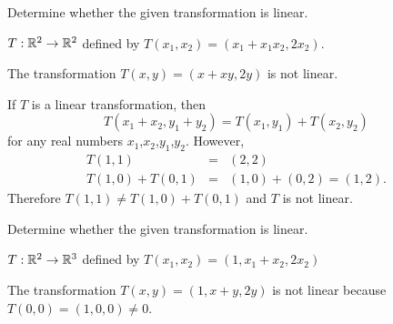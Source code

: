 \documentclass{article}
\begin{document}



\problemlabel

\noindent Determine whether the given transformation is linear.

\begin{exercise} \label{c4.3.6b}
  $T:\mathbb R^2\to\mathbb R^2$ defined by $T(x_1,x_2)=(x_1+x_1x_2,2x_2)$.

\begin{solution}
\ans The transformation $T(x,y) = (x + xy, 2y)$ is not linear.

\soln If $T$ is a linear transformation, then
\[
T(x_1 + x_2,y_1 + y_2) = T(x_1,y_1) + T(x_2,y_2)
\]
for any real numbers $x_1$,$x_2$,$y_1$,$y_2$.  However,
\[
\begin{array}{rcl}
T(1,1) & = & (2,2) \\
T(1,0) + T(0,1) & = & (1,0) + (0,2) = (1,2).\end{array}
\]
Therefore $T(1,1) \neq T(1,0) + T(0,1)$ and $T$ is not linear.

\end{solution}
\end{exercise}





\problemlabel

\noindent Determine whether the given transformation is linear.

\begin{exercise} \label{c4.3.6d}
  $T:\mathbb R^2\to\mathbb R^3$ defined by $T(x_1,x_2)=(1,x_1+x_2,2x_2)$

\begin{solution}
The transformation $T(x,y) = (1,x + y, 2y)$ is not linear
because $T(0,0) = (1,0,0) \neq 0$.

\end{solution}
\end{exercise}





\problemlabel
\end{document}
